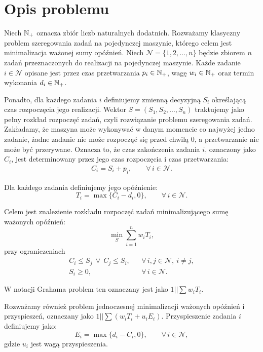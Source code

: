 \section{Opis problemu}

Niech $\mathbb{N}_+$ oznacza zbiór liczb naturalnych dodatnich. Rozważamy klasyczny
problem szeregowania zadań na pojedynczej maszynie, którego celem jest minimalizacja ważonej sumy opóźnień. Niech $\mathcal{N} = \{1,2,\dots,n\}$ będzie zbiorem $n$ zadań
przeznaczonych do realizacji na pojedynczej maszynie. Każde zadanie
$i \in \mathcal{N}$ opisane jest przez czas przetwarzania $p_i \in \mathbb{N}_+$,
wagę $w_i \in \mathbb{N}_+$ oraz termin wykonania $d_i \in \mathbb{N}_+$.

Ponadto, dla każdego zadania $i$ definiujemy zmienną decyzyjną $S_i$
określającą czas rozpoczęcia jego realizacji. Wektor
$S = (S_1, S_2, \dots, S_n)$ traktujemy jako pełny rozkład rozpoczęć zadań,
czyli rozwiązanie problemu szeregowania zadań. Zakładamy, że maszyna może wykonywać w danym momencie co najwyżej jedno
zadanie, żadne zadanie nie może rozpocząć się przed chwilą $0$, a
przetwarzanie nie może być przerywane. Oznacza to, że czas zakończenia
zadania $i$, oznaczony jako $C_i$, jest determinowany przez jego czas
rozpoczęcia i czas przetwarzania:
\begin{align}\label{eq:Ci}
    C_i = S_i + p_i, \qquad \forall\, i \in \mathcal{N}.
\end{align}

Dla każdego zadania definiujemy jego opóźnienie:
\begin{equation}\label{eq:Ti}
    T_i = \max\{C_i - d_i, 0\}, \qquad \forall\, i \in \mathcal{N}.
\end{equation}

Celem jest znalezienie rozkładu rozpoczęć zadań minimalizującego sumę
ważonych opóźnień:
\begin{equation}\label{eq:witi1}
    \min_S \sum_{i=1}^n w_i T_i,
\end{equation}
przy ograniczeniach
\begin{align}
    C_i \le S_j \ \vee \ C_j \le S_i,
    & & \forall\, i,j \in \mathcal{N},\ i \neq j, \label{eq:witi2} \\
    S_i \ge 0,
    & & \forall\, i \in \mathcal{N}. \label{eq:witi3}
\end{align}

W notacji Grahama \cite{GRAHAM1979287} problem ten oznaczany jest jako
$1||\sum w_i T_i$.

Rozważamy również problem jednoczesnej minimalizacji ważonych opóźnień i przyspieszeń,
oznaczany jako $1||\sum (w_i T_i + u_i E_i)$. Przyspieszenie zadania $i$ definiujemy jako:
\begin{equation}\label{eq:Ei}
    E_i = \max\{d_i - C_i, 0\}, \qquad \forall\, i \in \mathcal{N},
\end{equation}
gdzie $u_i$ jest wagą przyspieszenia.

